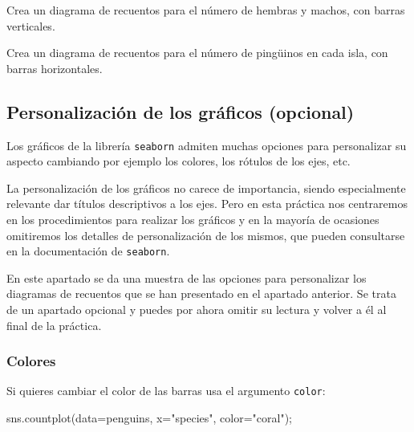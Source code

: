 \documentclass[
  a4paper,
  noprof,
  12pt,
  notoc,
  nosols,
  nobib]{mnye}
\newenvironment{Shaded}{\begin{snugshade}}{\end{snugshade}}
\newcommand{\NormalTok}[1]{\textcolor[rgb]{0.00,0.23,0.31}{#1}}
\newcommand{\OperatorTok}[1]{\textcolor[rgb]{0.37,0.37,0.37}{#1}}
\newcommand{\StringTok}[1]{\textcolor[rgb]{0.13,0.47,0.30}{#1}}
\renewenvironment{exercise}[1][]{
            \if\relax\detokenize{#1}\relax
                \ex
            \else
                \ex[note={#1}]
            \fi
        }{\endex}
\theoremstyle{definition}
\newtheorem{exercise}{Ejercicio}[section]
\theoremstyle{remark}
\begin{document}
\begin{exercise}[]%
\protect\hypertarget{exr-1categorial-countplot-vertical}{}\label{exr-1categorial-countplot-vertical}%
Crea un diagrama de recuentos para el número de hembras y machos, con
barras verticales.

\end{exercise}

\begin{exercise}[]%
\protect\hypertarget{exr-1categorial-sns-countplot}{}\label{exr-1categorial-sns-countplot}%
Crea un diagrama de recuentos para el número de pingüinos en cada isla,
con barras horizontales.

\end{exercise}

\subsection{Personalización de los gráficos
(opcional)}\label{personalizaciuxf3n-de-los-gruxe1ficos-opcional}

Los gráficos de la librería \texttt{seaborn} admiten muchas opciones
para personalizar su aspecto cambiando por ejemplo los colores, los
rótulos de los ejes, etc.

La personalización de los gráficos no carece de importancia, siendo
especialmente relevante dar títulos descriptivos a los ejes. Pero en
esta práctica nos centraremos en los procedimientos para realizar los
gráficos y en la mayoría de ocasiones omitiremos los detalles de
personalización de los mismos, que pueden consultarse en la
documentación de \texttt{seaborn}.

En este apartado se da una muestra de las opciones para personalizar los
diagramas de recuentos que se han presentado en el apartado anterior. Se
trata de un apartado opcional y puedes por ahora omitir su lectura y
volver a él al final de la práctica.

\subsubsection{Colores}\label{colores}

Si quieres cambiar el color de las barras usa el argumento
\texttt{color}:

\begin{Shaded}
\begin{Highlighting}[]
\NormalTok{sns.countplot(data}\OperatorTok{=}\NormalTok{penguins, x}\OperatorTok{=}\StringTok{"species"}\NormalTok{, color}\OperatorTok{=}\StringTok{"coral"}\NormalTok{)}\OperatorTok{;}
\end{Highlighting}
\end{Shaded}
\end{document}

